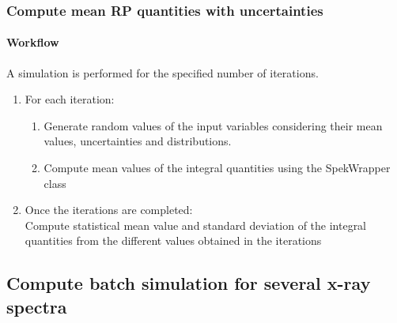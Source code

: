 \documentclass{beamer}
\newcommand{\highlight}[1]{{\color{blue} #1}}
\begin{document}
	\begin{frame}
		\frametitle{Compute mean RP quantities with uncertainties}
		\framesubtitle{Workflow}
		A simulation is performed for the specified number of iterations.
		\bigskip
		\begin{enumerate}
			\setlength\itemsep{1em}
			\item For each iteration:
			\begin{enumerate}
				\item \highlight{Generate random values} of the input variables considering their mean values, uncertainties and distributions.
				\item \highlight{Compute mean values} of the integral quantities using the SpekWrapper class
			\end{enumerate}
			\item Once the iterations are completed:\\
			\highlight{Compute statistical mean value and standard deviation} of the integral quantities from the different values obtained in the iterations
		\end{enumerate}
	\end{frame}
	
	\subsection{Compute batch simulation for several x-ray spectra}
	
\end{document}
